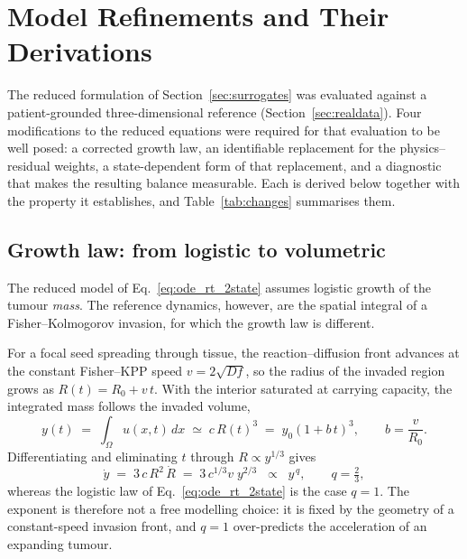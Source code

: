 
\section{Model Refinements and Their Derivations}
\label{sec:refinements}

The reduced formulation of Section~\ref{sec:surrogates} was evaluated against a
patient-grounded three-dimensional reference (Section~\ref{sec:realdata}). Four
modifications to the reduced equations were required for that evaluation to be
well posed: a corrected growth law, an identifiable replacement for the
physics--residual weights, a state-dependent form of that replacement, and a
diagnostic that makes the resulting balance measurable. Each is derived below
together with the property it establishes, and
Table~\ref{tab:changes} summarises them.

\subsection{Growth law: from logistic to volumetric}
\label{sec:volumetric}

The reduced model of Eq.~\eqref{eq:ode_rt_2state} assumes logistic growth of the
tumour \emph{mass}. The reference dynamics, however, are the spatial integral of
a Fisher--Kolmogorov invasion, for which the growth law is different.

For a focal seed spreading through tissue, the reaction--diffusion front
advances at the constant Fisher--KPP speed
$v = 2\sqrt{Df}$, so the radius of the invaded region grows as
$R(t) = R_{0} + v\,t$. With the interior saturated at carrying capacity, the
integrated mass follows the invaded volume,
\begin{equation}
\label{eq:volumetric_mass}
y(t) \;=\; \int_{\Omega} u(x,t)\,dx \;\simeq\; c\,R(t)^{3}
\;=\; y_{0}\left(1 + b\,t\right)^{3},
\qquad b = \frac{v}{R_{0}} .
\end{equation}
Differentiating and eliminating $t$ through $R \propto y^{1/3}$ gives
\begin{equation}
\label{eq:volumetric_rate}
\dot y \;=\; 3\,c\,R^{2}\,\dot R \;=\; 3\,c^{1/3}v\;y^{2/3}
\;\;\propto\;\; y^{\,q}, \qquad q = \tfrac{2}{3},
\end{equation}
whereas the logistic law of Eq.~\eqref{eq:ode_rt_2state} is the case $q = 1$.
The exponent is therefore not a free modelling choice: it is fixed by the
geometry of a constant-speed invasion front, and $q=1$ over-predicts the
acceleration of an expanding tumour.

